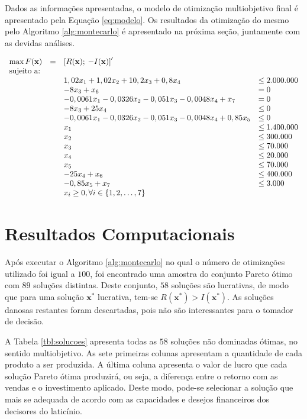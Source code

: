 \documentclass [11pt]{articleSBPO}
\begin{document}
Dados as informações apresentadas, o modelo de otimização multiobjetivo final é apresentado pela Equação \ref{eq:modelo}. Os resultados da otimização do mesmo pelo Algoritmo \ref{alg:montecarlo} é apresentado na próxima seção, juntamente com as devidas análises.

\begin{equation}
	\begin{array}{llll}
		\max F(\mathbf{x}) & = & \multicolumn{2}{l}{\left[R(\mathbf{x}); \: -I(\mathbf{x}) \right]'}\\
		\multicolumn{4}{l}{\mbox{sujeito a:}}\\
		&& 1,02 x_1 + 1,02 x_2 + 10,2 x_3 + 0,8 x_4 & \leq 2.000.000 \\
		&& -8 x_3 + x_6 & = 0 \\
		&& -0,0061x_1 - 0,0326x_2 - 0,051x_3 - 0,0048x_4 + x_7 & = 0 \\
		&& -8x_3 + 25x_4 & \leq 0 \\
		&& -0,0061x_1 - 0,0326x_2 - 0,051x_3 - 0,0048x_4 + 0,85x_5 & \leq 0 \\
		&& x_1 & \leq 1.400.000 \\
		&& x_2 & \leq 300.000 \\
		&& x_3 & \leq 70.000 \\
		&& x_4 & \leq 20.000 \\
		&& x_5 & \leq 70.000 \\
		&& -25x_4 + x_6 & \leq 400.000 \\
		&& -0,85x_5 + x_7 & \leq 3.000 \\
		&& \multicolumn{2}{l}{x_i \ge 0, \forall i \in \{ 1, 2, \ldots, 7\}}
	\end{array}
	\label{eq:modelo}
\end{equation}

\section{Resultados Computacionais}
\label{sec:resultados}

Após executar o Algoritmo \ref{alg:montecarlo} no qual o número de otimizações utilizado foi igual a $ 100 $, foi encontrado uma amostra do conjunto Pareto ótimo com $ 89 $ soluções distintas. Deste conjunto, $ 58 $ soluções são lucrativas, de modo que para uma solução $ \mathbf{x}^* $ lucrativa, tem-se $ R(\mathbf{x}^*) > I(\mathbf{x}^*) $. As soluções danosas restantes foram descartadas, pois não são interessantes para o tomador de decisão.

A Tabela \ref{tbl:solucoes} apresenta todas as $ 58 $ soluções não dominadas ótimas, no sentido multiobjetivo. As sete primeiras colunas apresentam a quantidade de cada produto a ser produzida. A última coluna apresenta o valor de lucro que cada solução Pareto ótima produzirá, ou seja, a diferença entre o retorno com as vendas e o investimento aplicado. Deste modo, pode-se selecionar a solução que mais se adequada de acordo com as capacidades e desejos financeiros dos decisores do laticínio.
\end{document}

